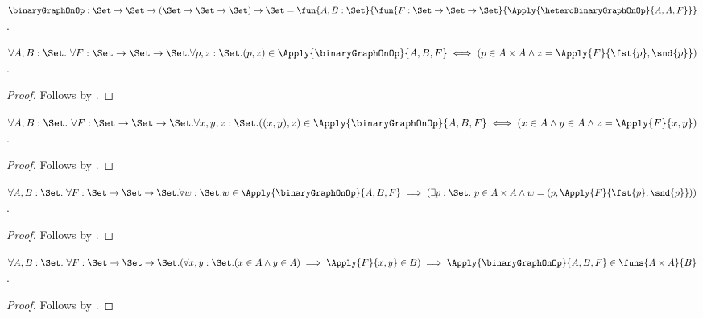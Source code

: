 \begin{definition}\label{logical_binary_graph_on}
    $\binaryGraphOnOp:\Set\to\Set\to(\Set\to\Set\to\Set)\to\Set
        =\fun{A,B:\Set}{
                \fun{F:\Set\to\Set\to\Set}{
                    \Apply{\heteroBinaryGraphOnOp}{A,A,F}}}$.
\end{definition}

\begin{proposition}\label{logical_binary_graph_on_pair_membership}
    $\forall A,B:\Set.\ \forall F:\Set\to\Set\to\Set.
     \forall p,z:\Set.
        (p,z)\in
            \Apply{\binaryGraphOnOp}{A,B,F}
        \iff
        (p\in A\times A\land
            z=\Apply{F}{\fst{p},\snd{p}})$.
\end{proposition}
\begin{proof}
    Follows by
        .
\end{proof}

\begin{proposition}\label{logical_binary_graph_on_membership}
    $\forall A,B:\Set.\ \forall F:\Set\to\Set\to\Set.
     \forall x,y,z:\Set.
        ((x,y),z)\in
            \Apply{\binaryGraphOnOp}{A,B,F}
        \iff
        (x\in A\land y\in A\land z=\Apply{F}{x,y})$.
\end{proposition}
\begin{proof}
    Follows by
        .
\end{proof}

\begin{proposition}\label{logical_binary_graph_on_elim}
    $\forall A,B:\Set.\ \forall F:\Set\to\Set\to\Set.
     \forall w:\Set.
        w\in\Apply{\binaryGraphOnOp}{A,B,F}
        \implies
        (\exists p:\Set.\ p\in A\times A\land
            w=(p,\Apply{F}{\fst{p},\snd{p}}))$.
\end{proposition}
\begin{proof}
    Follows by
        .
\end{proof}

\begin{theorem}\label{logical_binary_graph_on_function}
    $\forall A,B:\Set.\ \forall F:\Set\to\Set\to\Set.
        (\forall x,y:\Set.
            (x\in A\land y\in A)\implies
            \Apply{F}{x,y}\in B)
        \implies
        \Apply{\binaryGraphOnOp}{A,B,F}
            \in\funs{A\times A}{B}$.
\end{theorem}
\begin{proof}
    Follows by
        .
\end{proof}

